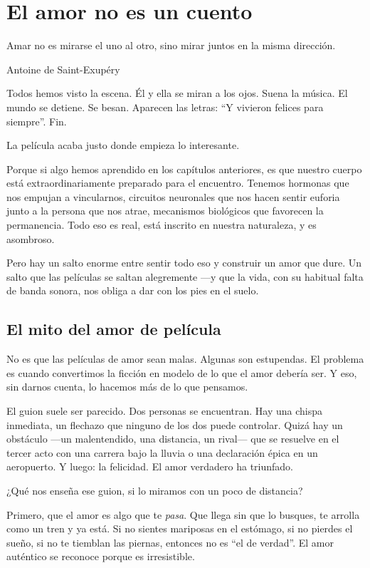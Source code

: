 \chapter{El amor no es un cuento}

\epigraph{Amar no es mirarse el uno al otro, sino mirar juntos en la misma dirección.}{Antoine de Saint-Exupéry}

Todos hemos visto la escena. Él y ella se miran a los ojos. Suena la música. El mundo se detiene. Se besan. Aparecen las letras: ``Y vivieron felices para siempre''. Fin.

La película acaba justo donde empieza lo interesante.

Porque si algo hemos aprendido en los capítulos anteriores, es que nuestro cuerpo está extraordinariamente preparado para el encuentro. Tenemos hormonas que nos empujan a vincularnos, circuitos neuronales que nos hacen sentir euforia junto a la persona que nos atrae, mecanismos biológicos que favorecen la permanencia. Todo eso es real, está inscrito en nuestra naturaleza, y es asombroso.

Pero hay un salto enorme entre sentir todo eso y construir un amor que dure. Un salto que las películas se saltan alegremente ---y que la vida, con su habitual falta de banda sonora, nos obliga a dar con los pies en el suelo.

\section{El mito del amor de película}

No es que las películas de amor sean malas. Algunas son estupendas. El problema es cuando convertimos la ficción en modelo de lo que el amor debería ser. Y eso, sin darnos cuenta, lo hacemos más de lo que pensamos.

El guion suele ser parecido. Dos personas se encuentran. Hay una chispa inmediata, un flechazo que ninguno de los dos puede controlar. Quizá hay un obstáculo ---un malentendido, una distancia, un rival--- que se resuelve en el tercer acto con una carrera bajo la lluvia o una declaración épica en un aeropuerto. Y luego: la felicidad. El amor verdadero ha triunfado.

¿Qué nos enseña ese guion, si lo miramos con un poco de distancia?

Primero, que el amor es algo que te \textit{pasa}. Que llega sin que lo busques, te arrolla como un tren y ya está. Si no sientes mariposas en el estómago, si no pierdes el sueño, si no te tiemblan las piernas, entonces no es ``el de verdad''. El amor auténtico se reconoce porque es irresistible.

